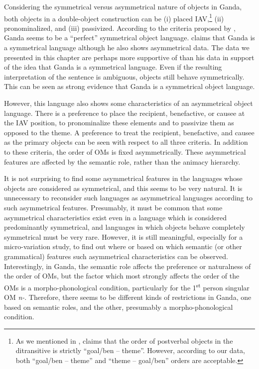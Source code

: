 \documentclass[output=paper,
            colorlinks, citecolor=brown
            ,draftmode
		  ]{langscibook}
\begin{document}
Considering the symmetrical versus asymmetrical nature of objects in Ganda, both objects in a double-object construction can be (i) placed IAV,\footnote{As we mentioned in , \citet{Ranero2019} claims that the order of postverbal objects in the ditransitive is strictly ``goal/ben -- theme''. However, according to our data, both ``goal/ben -- theme'' and ``theme -- goal/ben'' orders are acceptable.} (ii) pronominalized, and (iii) passivized. According to the criteria proposed by \citet{BresnanMoshi1993}, Ganda seems to be a ``perfect'' symmetrical object language. \citet{Ssekiryango2006} claims that Ganda is a symmetrical language although he also shows asymmetrical data. The data we presented in this chapter are perhaps more supportive of \citet{Ssekiryango2006} than his data in support of the idea that Ganda is a symmetrical language. Even if the resulting interpretation of the sentence is ambiguous, objects still behave symmetrically. This can be seen as strong evidence that Ganda is a symmetrical object language. 



However, this language also shows some characteristics of an asymmetrical object language. There is a preference to place the recipient, benefactive, or causee at the IAV position, to pronominalize these elements and to passivize them as opposed to the theme. A preference to treat the recipient, benefactive, and causee as the primary objects can be seen with respect to all three criteria. In addition to these criteria, the order of OMs is fixed asymmetrically. These asymmetrical features are affected by the semantic role, rather than the animacy hierarchy.  


    It is not surprising to find some asymmetrical features in the languages whose objects are considered as symmetrical, and this seems to be very natural. It is unnecessary to reconsider such languages as asymmetrical languages according to such asymmetrical features. Presumably, it must be common that some asymmetrical characteristics exist even in a language which is considered predominantly symmetrical, and languages in which objects behave completely symmetrical must be very rare. However, it is still meaningful, especially for a micro-variation study, to find out where or based on which semantic (or other grammatical) features such asymmetrical characteristics can be observed. Interestingly, in Ganda, the semantic role affects the preference or naturalness of the order of OMs, but the factor which most strongly affects the order of the OMs is a morpho-phonological condition, particularly for the 1\textsuperscript{st} person singular OM \textit{n-}. Therefore, there seems to be different kinds of restrictions in Ganda, one based on semantic roles, and the other, presumably a morpho-phonological condition.
\end{document}
